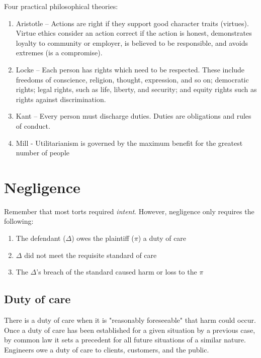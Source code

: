 \documentclass{article}
\begin{document}
Four practical philosophical theories:

\begin{enumerate}
\item Aristotle -- Actions are right if they support good character traits (virtues). Virtue ethics consider an action correct if the action is honest, demonstrates loyalty to community or employer, is believed to be responsible, and avoids extremes (is a compromise).

\item Locke -- Each person has rights which need to be respected. These include freedoms of conscience, religion, thought, expression, and so on; democratic rights; legal rights, such as life, liberty, and security; and equity rights such as rights against discrimination.

\item Kant -- Every person must discharge duties. Duties are obligations and rules of conduct.

\item Mill - Utilitarianism is governed by the maximum benefit for the greatest number of people 

\end{enumerate}

\section{Negligence}

Remember that most torts required \textit{intent}. However, negligence only requires the following:

\begin{enumerate}
\item The defendant ($\Delta$) owes the plaintiff ($\pi$) a duty of care 
\item $\Delta$ did not meet the requisite standard of care
\item The $\Delta$'s breach of the standard caused harm or loss to the $\pi$
\end{enumerate}

\subsection{Duty of care}

There is a duty of care when it is "reasonably foreseeable" that harm could occur. Once a duty of care has been established for a given situation by a previous case, by common law it sets a precedent for all future situations of a similar nature. Engineers owe a duty of care to clients, customers, and the public.
\end{document}
